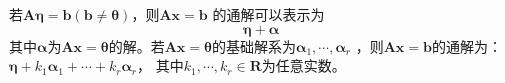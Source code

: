 \begin{theorem}
    若$\boldsymbol{A}\boldsymbol{\eta}=\boldsymbol{b}(\boldsymbol{b}\neq \boldsymbol{\theta})$，则$\boldsymbol{A}\boldsymbol{x}=\boldsymbol{b}$
    的通解可以表示为
    $$\boldsymbol{\eta}+\boldsymbol{\alpha}$$
    其中$\boldsymbol{\alpha}$为$\boldsymbol{A}\boldsymbol{x}=\boldsymbol{\theta}$的解。若$\boldsymbol{A}\boldsymbol{x}=\boldsymbol{\theta}$的基础解系为$\boldsymbol{\alpha}_1,\cdots,\boldsymbol{\alpha}_r$
    ，则$\boldsymbol{A}\boldsymbol{x}=\boldsymbol{b}$的通解为：
    $\boldsymbol{\eta}+k_1\boldsymbol{\alpha}_1+\cdots+k_r\boldsymbol{\alpha}_r$，
    其中$k_1,\cdots,k_r\in \mathbf{R}$为任意实数。
\end{theorem}
